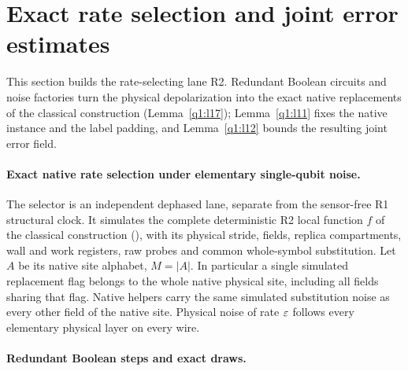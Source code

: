 \section{Exact rate selection and joint error estimates}\label{q1:selector}
This section builds the rate-selecting lane R2. Redundant Boolean circuits and noise factories turn the physical depolarization into the exact native replacements of the classical construction (Lemma~\ref{q1:l17}); Lemma~\ref{q1:l11} fixes the native instance and the label padding, and Lemma~\ref{q1:l12} bounds the resulting joint error field.

\paragraph{Exact native rate selection under elementary single-qubit noise.}

The selector is an independent dephased lane, separate from the sensor-free R1 structural clock. It simulates the complete deterministic R2 local function \(f\) of the classical construction (\cite[Sections~\ref*{cl:sec:embedding}, \ref*{cl:sec:receiver} and~\ref*{cl:sec:stripes}]{DMNoise1D2026}), with its physical stride, fields, replica compartments, wall and work registers, raw probes and common whole-symbol substitution. Let \(A\) be its native site alphabet, \(M=|A|\). In particular a single simulated replacement flag belongs to the whole native physical site, including all fields sharing that flag. Native helpers carry the same simulated substitution noise as every other field of the native site. Physical noise of rate \(\varepsilon\) follows every elementary physical layer on every wire.

\paragraph{Redundant Boolean steps and exact draws.}

